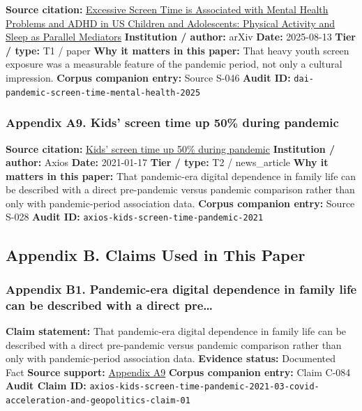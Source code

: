 \documentclass[
  american,
  11pt,
  letterpaper,
]{article}
\begin{document}
\textbf{Source citation:}
\href{https://arxiv.org/abs/2508.10062}{Excessive Screen Time is
Associated with Mental Health Problems and ADHD in US Children and
Adolescents: Physical Activity and Sleep as Parallel Mediators}
\textbf{Institution / author:} arXiv \textbf{Date:} 2025-08-13
\textbf{Tier / type:} T1 / paper \textbf{Why it matters in this paper:}
That heavy youth screen exposure was a measurable feature of the
pandemic period, not only a cultural impression. \textbf{Corpus
companion entry:} Source S-046 \textbf{Audit ID:}
\texttt{dai-pandemic-screen-time-mental-health-2025}

\subsubsection{Appendix A9. Kids' screen time up 50\% during
pandemic}\label{ch-03-appendix-a9-kids-screen-time-up-50-during-pandemic}

\textbf{Source citation:}
\href{https://www.axios.com/2021/01/17/kids-screen-time-pandemic}{Kids'
screen time up 50\% during pandemic} \textbf{Institution / author:}
Axios \textbf{Date:} 2021-01-17 \textbf{Tier / type:} T2 / news\_article
\textbf{Why it matters in this paper:} That pandemic-era digital
dependence in family life can be described with a direct pre-pandemic
versus pandemic comparison rather than only with pandemic-period
association data. \textbf{Corpus companion entry:} Source S-028
\textbf{Audit ID:} \texttt{axios-kids-screen-time-pandemic-2021}

\subsection{Appendix B. Claims Used in This
Paper}\label{appendix-b.-claims-used-in-this-paper-3}

\subsubsection{Appendix B1. Pandemic-era digital dependence in family
life can be described with a direct
pre\ldots{}}\label{ch-03-appendix-b1-pandemic-era-digital-dependence-in-family-life-can-be-described-with-a-direct-pre}

\textbf{Claim statement:} That pandemic-era digital dependence in family
life can be described with a direct pre-pandemic versus pandemic
comparison rather than only with pandemic-period association data.
\textbf{Evidence status:} Documented Fact \textbf{Source support:}
\hyperref[ch-03-appendix-a9-kids-screen-time-up-50-during-pandemic]{Appendix
A9} \textbf{Corpus companion entry:} Claim C-084 \textbf{Audit Claim
ID:}
\texttt{axios-kids-screen-time-pandemic-2021-03-covid-acceleration-and-geopolitics-claim-01}
\end{document}
